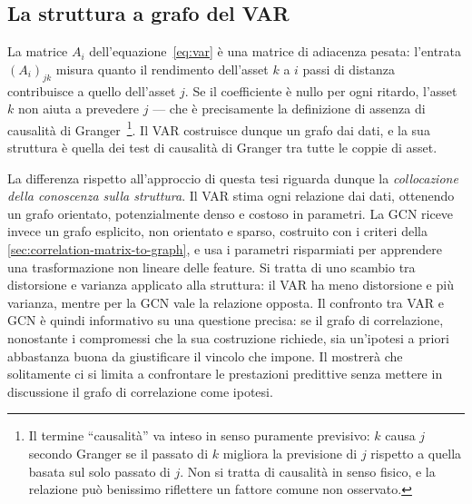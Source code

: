 \subsection{La struttura a grafo del VAR}

La matrice $A_i$ dell'equazione~\eqref{eq:var} è una matrice di adiacenza pesata: l'entrata $(A_i)_{jk}$ misura quanto il rendimento dell'asset $k$ a $i$ passi di distanza contribuisce a quello dell'asset $j$. Se il coefficiente è nullo per ogni ritardo, l'asset $k$ non aiuta a prevedere $j$ — che è precisamente la definizione di assenza di causalità di Granger~\cite{granger1969investigating}\footnote{Il termine \enquote{causalità} va inteso in senso puramente previsivo: $k$ causa $j$ secondo Granger se il passato di $k$ migliora la previsione di $j$ rispetto a quella basata sul solo passato di $j$. Non si tratta di causalità in senso fisico, e la relazione può benissimo riflettere un fattore comune non osservato.}. Il VAR costruisce dunque un grafo dai dati, e la sua struttura è quella dei test di causalità di Granger tra tutte le coppie di asset.

La differenza rispetto all'approccio di questa tesi riguarda dunque la \emph{collocazione della conoscenza sulla struttura}. Il VAR stima ogni relazione dai dati, ottenendo un grafo orientato, potenzialmente denso e costoso in parametri. La GCN riceve invece un grafo esplicito, non orientato e sparso, costruito con i criteri della \cref{sec:correlation-matrix-to-graph}, e usa i parametri risparmiati per apprendere una trasformazione non lineare delle feature. Si tratta di uno scambio tra distorsione e varianza applicato alla struttura: il VAR ha meno distorsione e più varianza, mentre per la GCN vale la relazione opposta. Il confronto tra VAR e GCN è quindi informativo su una questione precisa: se il grafo di correlazione, nonostante i compromessi che la sua costruzione richiede, sia un'ipotesi a priori abbastanza buona da giustificare il vincolo che impone. Il  mostrerà che solitamente ci si limita a confrontare le prestazioni predittive senza mettere in discussione il grafo di correlazione come ipotesi.
